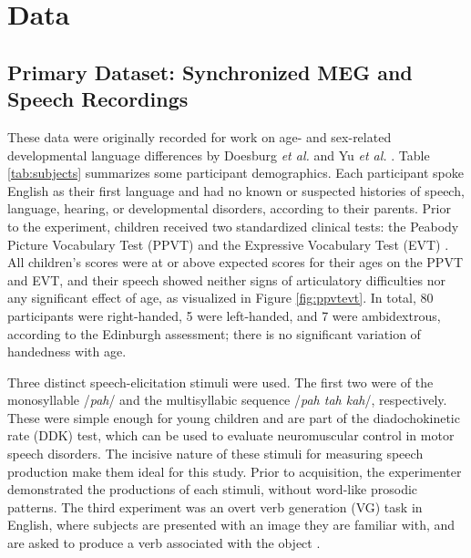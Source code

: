 \documentclass[utf8]{frontiersSCNS} %
\begin{document}
\section{Data}

\subsection{Primary Dataset: Synchronized MEG and Speech Recordings}

These data were originally recorded for work on age- and sex-related developmental language differences by Doesburg \emph{et al.} and Yu \emph{et al.} \cite{Doesburg2016, Yu2014}. Table \ref{tab:subjects} summarizes some participant demographics. Each participant spoke English as their first language and had no known or suspected histories of speech, language, hearing, or developmental disorders, according to their parents. Prior to the experiment, children received two standardized clinical tests: the Peabody Picture Vocabulary Test (PPVT) \cite{Dunn97} and the Expressive Vocabulary Test (EVT) \cite{EVT}. All children's scores were at or above expected scores for their ages on the PPVT and EVT, and their speech showed neither signs of articulatory difficulties nor any significant effect of age, as visualized in Figure \ref{fig:ppvtevt}. In total, 80 participants were right-handed, 5 were left-handed, and 7 were ambidextrous, according to the Edinburgh assessment; there is no significant variation of handedness with age.


Three distinct speech-elicitation stimuli were used. The first two were of the monosyllable /{\em pah}/ and the multisyllabic sequence /{\em pah tah kah}/, respectively. These were simple enough for young children and are part of the diadochokinetic rate (DDK) test, which can be used to evaluate neuromuscular control in motor speech disorders. The incisive nature of these stimuli for measuring speech production make them ideal for this study. Prior to acquisition, the experimenter demonstrated the productions of each stimuli, without word-like prosodic patterns. The third experiment was an overt verb generation (VG) task in English, where subjects are presented with an image they are familiar with, and are asked to produce a verb associated with the object \cite{Doesburg2016}.
\end{document}
